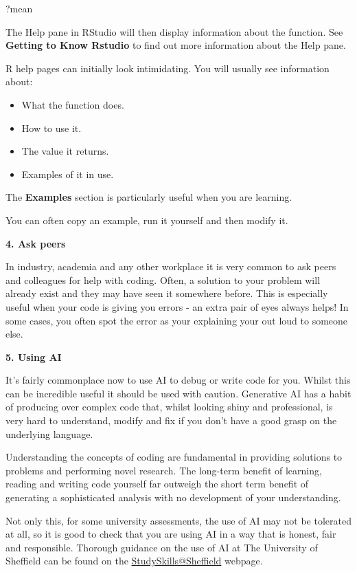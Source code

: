 \documentclass[
]{book}
\newenvironment{Shaded}{\begin{snugshade}}{\end{snugshade}}
\newcommand{\NormalTok}[1]{#1}
\providecommand{\tightlist}{%
  \setlength{\itemsep}{0pt}\setlength{\parskip}{0pt}}
\begin{document}
\begin{Shaded}
\begin{Highlighting}[]
\NormalTok{?mean}
\end{Highlighting}
\end{Shaded}

The Help pane in RStudio will then display information about the function. See \textbf{Getting to Know Rstudio} to find out more information about the Help pane.

R help pages can initially look intimidating. You will usually see information about:

\begin{itemize}
\tightlist
\item
  What the function does.
\item
  How to use it.
\item
  The value it returns.
\item
  Examples of it in use.
\end{itemize}

The \textbf{Examples} section is particularly useful when you are learning.

You can often copy an example, run it yourself and then modify it.

\textbf{4. Ask peers}

In industry, academia and any other workplace it is very common to ask peers and colleagues for help with coding. Often, a solution to your problem will already exist and they may have seen it somewhere before. This is especially useful when your code is giving you errors - an extra pair of eyes always helps! In some cases, you often spot the error as your explaining your out loud to someone else.

\textbf{5. Using AI}

It's fairly commonplace now to use AI to debug or write code for you. Whilst this can be incredible useful it should be used with caution. Generative AI has a habit of producing over complex code that, whilst looking shiny and professional, is very hard to understand, modify and fix if you don't have a good grasp on the underlying language.

Understanding the concepts of coding are fundamental in providing solutions to problems and performing novel research. The long-term benefit of learning, reading and writing code yourself far outweigh the short term benefit of generating a sophisticated analysis with no development of your understanding.

Not only this, for some university assessments, the use of AI may not be tolerated at all, so it is good to check that you are using AI in a way that is honest, fair and responsible. Thorough guidance on the use of AI at The University of Sheffield can be found on the \href{https://sheffield.ac.uk/study-skills/digital/generative-ai/assessment\#unfair-means}{StudySkills@Sheffield} webpage.
\end{document}
